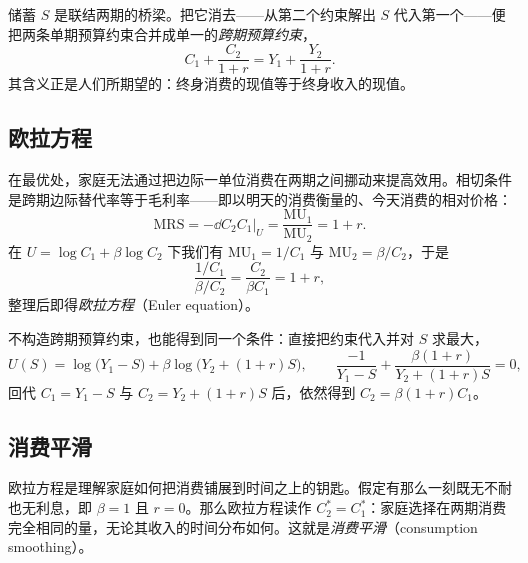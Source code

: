 储蓄 $S$ 是联结两期的桥梁。把它消去——从第二个约束解出 $S$ 代入第一个——便把两条单期预算约束合并成单一的\emph{跨期预算约束}，
\[
C_1 + \frac{C_2}{1+r} = Y_1 + \frac{Y_2}{1+r}.
\]
其含义正是人们所期望的：终身消费的现值等于终身收入的现值。

\subsection{欧拉方程}

在最优处，家庭无法通过把边际一单位消费在两期之间挪动来提高效用。相切条件是跨期边际替代率等于毛利率——即以明天的消费衡量的、今天消费的相对价格：
\[
\mathrm{MRS} = -\dd{C_2}{C_1}\bigg|_{U} = \frac{\mathrm{MU}_1}{\mathrm{MU}_2} = 1 + r.
\]
在 $U = \log C_1 + \beta \log C_2$ 下我们有 $\mathrm{MU}_1 = 1/C_1$ 与 $\mathrm{MU}_2 = \beta/C_2$，于是
\[
\frac{1/C_1}{\beta/C_2} = \frac{C_2}{\beta C_1} = 1 + r,
\]
整理后即得\emph{欧拉方程}（Euler equation）。



不构造跨期预算约束，也能得到同一个条件：直接把约束代入并对 $S$ 求最大，
\[
U(S) = \log\!\big(Y_1 - S\big) + \beta \log\!\big(Y_2 + (1+r)S\big),
\qquad
\frac{-1}{Y_1 - S} + \frac{\beta(1+r)}{Y_2 + (1+r)S} = 0,
\]
回代 $C_1 = Y_1 - S$ 与 $C_2 = Y_2 + (1+r)S$ 后，依然得到 $C_2 = \beta(1+r)C_1$。

\subsection{消费平滑}

欧拉方程是理解家庭如何把消费铺展到时间之上的钥匙。假定有那么一刻既无不耐也无利息，即 $\beta = 1$ 且 $r = 0$。那么欧拉方程读作 $C_2^* = C_1^*$：家庭选择在两期消费完全相同的量，无论其收入的时间分布如何。这就是\emph{消费平滑}（consumption smoothing）。


